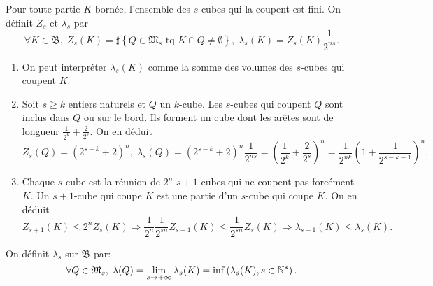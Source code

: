 \noindent Pour toute partie $K$ bornée, l'ensemble des $s$-cubes qui la coupent est fini. On définit $Z_s$ et $\lambda_s$ par
\begin{displaymath}
 \forall K \in \mathfrak{B}, \; Z_s(K) = \sharp \left\lbrace Q \in \mathfrak{M}_s \text{ tq } K \cap Q \neq \emptyset \right\rbrace, \; \lambda_s(K) = Z_s(K)\frac{1}{2^{ns}}.
\end{displaymath}

\begin{rems}
 \begin{enumerate}
  \item On peut interpréter $\lambda_s(K)$ comme la somme des volumes des $s$-cubes qui coupent $K$.
  \item Soit $s \geq k$ entiers naturels et $Q$ un $k$-cube. Les $s$-cubes qui coupent $Q$ sont inclus dans $Q$ ou sur le bord. Ils forment un cube dont les arêtes sont de longueur $\frac{1}{2^k} + \frac{2}{2^s}$. On en déduit
  \begin{displaymath}
   Z_s(Q) = (2^{s-k} + 2)^n, \; \lambda_s(Q) = (2^{s-k} + 2)^n \frac{1}{2^{ns}} = (\frac{1}{2^k}+\frac{2}{2^s})^n
     = \frac{1}{2^{nk}}(1 + \frac{1}{2^{s-k-1}})^n.
  \end{displaymath}
  \item Chaque $s$-cube est la réunion de $2^n$ $s+1$-cubes qui ne coupent pas forcément $K$. Un $s+1$-cube qui coupe $K$ est une partie d'un $s$-cube qui coupe $K$. On en déduit
\begin{displaymath}
 Z_{s+1}(K) \leq 2^n Z_s(K) \Rightarrow \frac{1}{2^n} \frac{1}{2^{sn}} Z_{s+1}(K) \leq \frac{1}{2^{sn}} Z_{s}(K) \Rightarrow \lambda_{s+1}(K) \leq \lambda_s(K).
\end{displaymath}
 \end{enumerate}
\end{rems}
\begin{defi}
On définit $\lambda_s$ sur $\mathfrak{B}$ par:
\begin{displaymath}
  \forall Q \in \mathfrak{M}_s, \; \lambda(Q) = \lim_{s\rightarrow +\infty} \lambda_s(K) = \inf\left( \lambda_s(K), s \in \mathbb{N}^*\right).
\end{displaymath}
\end{defi}
